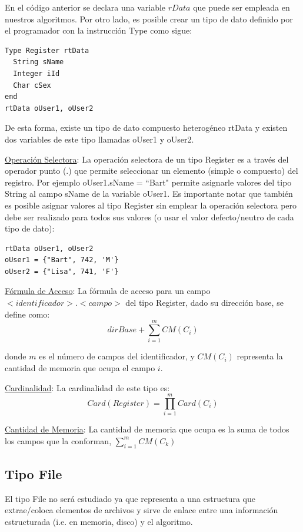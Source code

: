En el código anterior se declara una variable $rData$ que puede ser empleada en nuestros algoritmos. Por otro lado, es posible crear un tipo de dato definido por el programador con la instrucción Type como sigue:

\begin{lstlisting}[upquote=true, language=pseudo]
Type Register rtData
  String sName
  Integer iId
  Char cSex
end
rtData oUser1, oUser2
\end{lstlisting}

De esta forma, existe un tipo de dato compuesto heterogéneo rtData y existen dos variables de este tipo llamadas oUser1 y oUser2.

\underline{Operación Selectora}: La operación selectora de un tipo Register es a través del operador punto (.) que permite seleccionar un elemento (simple o compuesto) del registro. Por ejemplo oUser1.sName = ``Bart" permite asignarle valores del tipo String al campo sName de la variable oUser1. Es importante notar que también es posible asignar valores al tipo Register sin emplear la operación selectora pero debe ser realizado para todos sus valores (o usar el valor defecto/neutro de cada tipo de dato):
\begin{lstlisting}[upquote=true, language=pseudo]
rtData oUser1, oUser2
oUser1 = {"Bart", 742, 'M'}
oUser2 = {"Lisa", 741, 'F'}
\end{lstlisting}

\underline{Fórmula de Acceso}: La fórmula de acceso para un campo $<identificador>.<campo>$ del tipo Register, dado su dirección base, se define como:
$$dirBase + \sum_{i=1}^{m}{CM(C_i)}$$

\noindent donde $m$ es el número de campos del identificador, y $CM(C_i)$ representa la cantidad de memoria que ocupa el campo $i$.

\underline{Cardinalidad}: La cardinalidad de este tipo es:
$$Card(Register) = \prod_{i=1}^{m}Card(C_i)$$

\underline{Cantidad de Memoria}: La cantidad de memoria que ocupa es la suma de todos los campos que la conforman, $\sum_{i=1}^{m}CM(C_k)$

\subsection{Tipo File}

El tipo File no será estudiado ya que representa a una estructura que extrae/coloca elementos de archivos y sirve de enlace entre una información estructurada (i.e. en memoria, disco) y el algoritmo.

